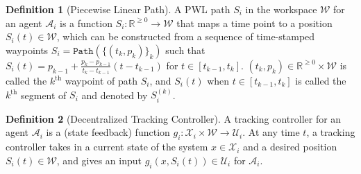 \documentclass[letterpaper]{article} %
\theoremstyle{definition}
\newtheorem{definition}{Definition}
\newcommand{\reals}{\mathbb{R}}
\newcommand{\nnreals}{\reals^{\ge 0}}
\begin{document}
\begin{definition}[Piecewise Linear Path]
A PWL path $S_i$ in the workspace $\mathcal{W}$ for an agent $\mathcal{A}_i$ is a function $S_i: \nnreals \rightarrow \mathcal{W}$ that maps a time point to a position $S_i(t) \in \mathcal{W}$, which can be constructed from a sequence of time-stamped waypoints $S_i= \texttt{Path} ( \{(t_k, p_k)\}_k)$ such that $S_i(t) = p_{k-1} + \frac{p_k - p_{k-1}}{t_k - t_{k-1}} (t - t_{k-1})$ for $t\in[t_{k-1},t_{k}]$. $(t_k, p_k) \in \nnreals \times \mathcal{W}$ is called the $k^\text{th}$ waypoint of path $S_i$, and $S_i(t)$ when $t\in[t_{k-1},t_{k}]$ is called the $k^\text{th}$ segment of $S_i$ and denoted by $S^{(k)}_i$. %
\end{definition}


\begin{definition}[Decentralized Tracking Controller]
A tracking controller for an agent $\mathcal{A}_i$ is a (state feedback) function $g_i: \mathcal{X}_i \times \mathcal{W} \rightarrow \mathcal{U}_i$. At any time $t$, a tracking controller takes in  a current state of the system $x \in \mathcal{X}_i$ and a desired position $S_i(t) \in \mathcal{W}$, and gives an input $g_i(x, S_i(t)) \in \mathcal{U}_i$ for $\mathcal{A}_i$.
\end{definition}
\end{document}
